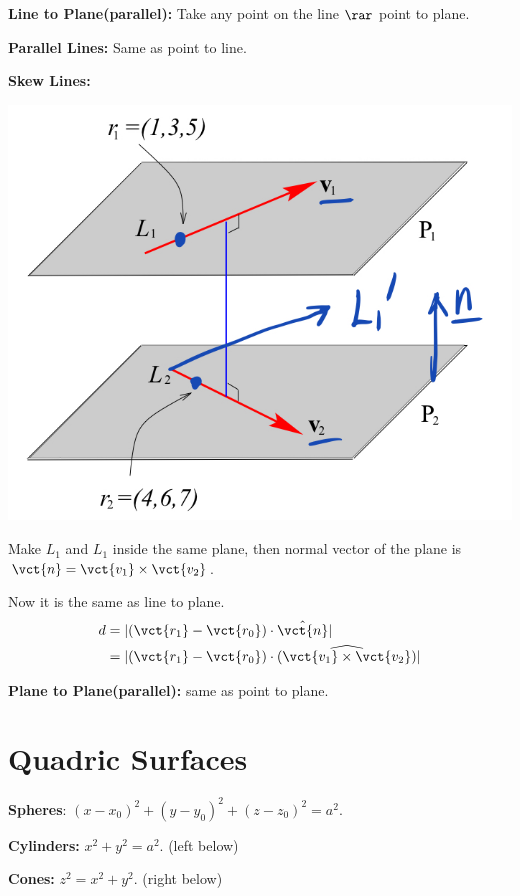 \begin{spacing}{1.3}
    {\bf Line to Plane(parallel): } Take any point on the line $\rar$ point to plane.

    {\bf Parallel Lines: } Same as point to line.

    {\bf Skew Lines:} 

    \begin{center}
        \includegraphics[scale=0.3]{images/Ch10-dist-line-line.jpeg}
    \end{center}

    Make $L_1$ and $L_1$ inside the same plane, then normal vector of 
    the plane is $\vct{n}=\vct{v_1}\times \vct{v_2}$.

    Now it is the same as line to plane.
    \begin{align*}
        d &= | (\vct{r_1}-\vct{r_0})\cdot \hat{\vct{n}} |\\
         &= | (\vct{r_1}-\vct{r_0})\cdot \widehat{(\vct{v_1}\times \vct{v_2})} |
    \end{align*}

    
    {\bf Plane to Plane(parallel):} same as point to plane. 


    \section{Quadric Surfaces}


    {\bf Spheres}: $(x-x_0)^2+(y-y_0)^2+(z-z_0)^2=a^2$.

    {\bf Cylinders:} $x^2+y^2=a^2$. (left below)

    {\bf Cones:} $z^2=x^2+y^2$. (right below)
    

\end{spacing}
